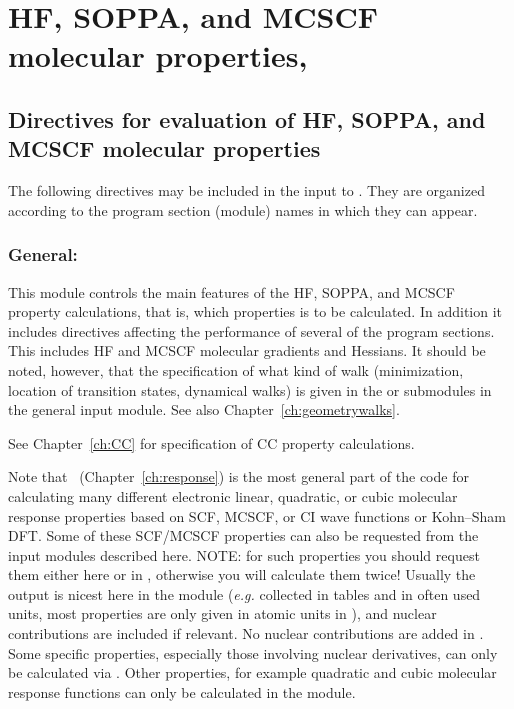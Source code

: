 \chapter{HF, SOPPA, and MCSCF molecular properties, \abacus}\label{ch:abacus}

\section{Directives for evaluation of HF, SOPPA, and MCSCF molecular properties}
\label{sec:abainp}

  The following directives may be included in the input to \aba.
They are organized according to the program section (module) names
in which they can appear.

\subsection{General: }\label{subsec:abacus}

This module controls the main features of the HF, SOPPA, and MCSCF property calculations,
that is, which properties is to be calculated.
In addition it includes
directives affecting the performance of several of the program
sections.
This includes HF and MCSCF molecular gradients and Hessians.
It should be noted, however, that the specification of what
kind of walk (minimization, location of
transition states, dynamical
walks) is given in the  or 
submodules in the general input  module. See also Chapter~\ref{ch:geometrywalks}.

See Chapter~\ref{ch:CC} for specification of CC property calculations.

Note that \resp\ (Chapter~\ref{ch:response})
is the most general part of the code for calculating
many different electronic linear, quadratic, or cubic molecular
response properties based on SCF, MCSCF, or CI wave functions or Kohn--Sham DFT.
Some of these SCF/MCSCF properties can also be requested
from the  input modules described here.
NOTE: for such properties you should request them either here or
in , otherwise you will calculate them twice!
Usually the output is nicest here in
the  module ({\it e.g.\/} collected in tables and in
often used units, most properties are only given in atomic
units in \resp), and nuclear contributions are included if relevant.
No nuclear contributions are added in \resp .
Some specific properties, especially those involving nuclear derivatives,
can only be calculated via .
Other properties, for example quadratic and cubic molecular response functions
can only be calculated in the  module.


